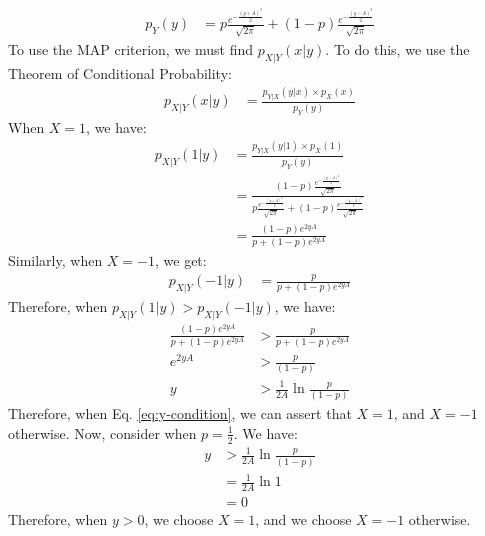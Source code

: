 \documentclass[journal,12pt,twocolumn]{IEEEtran}
\renewcommand\thesection{\arabic{section}}
\begin{document}
\begin{enumerate}[label=\thesection.\arabic*
,ref=\thesection.\theenumi]
\begin{align}
    p_Y(y) &=  p \frac{e^{-\frac{(y+A)^2}{2}}}{\sqrt{2\pi}} + \left(1-p\right) \frac{e^{-\frac{(y-A)^2}{2}}}{\sqrt{2\pi}}
\end{align}
To use the MAP criterion, we must find $p_{X|Y}(x|y)$. To do this, we use the Theorem of Conditional Probability:
\begin{align}
    p_{X|Y}(x|y) &= \frac{p_{Y|X}(y|x) \times p_X(x)}{p_Y(y)}
\end{align}
When $X=1$, we have:
\begin{align}
    p_{X|Y}(1|y) &= \frac{p_{Y|X}(y|1) \times p_X(1)}{p_Y(y)} \\
    &= \frac{\left(1-p\right) \frac{e^{-\frac{(y-A)^2}{2}}}{\sqrt{2\pi}}}{ p \frac{e^{-\frac{(y+A)^2}{2}}}{\sqrt{2\pi}} + \left(1-p\right) \frac{e^{-\frac{(y-A)^2}{2}}}{\sqrt{2\pi}}} \\
    &= \frac{\left(1-p\right) e^{2yA}}{p + \left(1-p\right) e^{2yA}}
\end{align}
Similarly, when $X = -1$, we get:
\begin{align}
    p_{X|Y}(-1|y) &= \frac{p}{p + \left(1-p\right) e^{2yA}} 
\end{align}
Therefore, when $ p_{X|Y}(1|y) >  p_{X|Y}(-1|y)$, we have:
\begin{align}
    \frac{\left(1-p\right) e^{2yA}}{p + \left(1-p\right) e^{2yA}} &> \frac{p}{p + \left(1-p\right) e^{2yA}} \\
    e^{2yA} &> \frac{p}{\left(1-p\right)} \\
    \label{eq:y-condition}
    y &> \frac{1}{2A} \ln{\frac{p}{\left(1-p\right)}}
\end{align}
Therefore, when Eq. \eqref{eq:y-condition}, we can assert that $X = 1$, and $X = -1$ otherwise.
Now, consider when $p = \frac{1}{2} $.
We have:
\begin{align}
    y &> \frac{1}{2A} \ln{\frac{p}{\left(1-p\right)}} \\
    &= \frac{1}{2A} \ln{1} \\
    &= 0
\end{align}
Therefore, when $y > 0$, we choose $X = 1$, and we choose $X = -1$ otherwise.

\end{enumerate}


\end{document}
